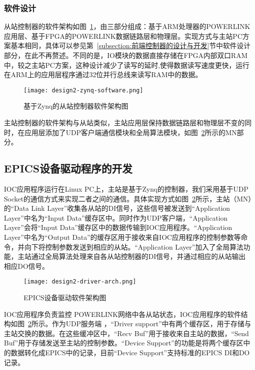 \subsubsection{软件设计}

从站控制器的软件架构如图~\ref{fig:design2-zynq-software}，由三部分组成：基于ARM处理器的POWERLINK应用层、基于FPGA的POWERLINK数据链路层和物理层。实现方式与主站PC方案基本相同，具体可以参见第~\ref{subsection:前端控制器的设计与开发}节中软件设计部分，在此不再赘述。不同的是，IO模块的数据直接存储在FPGA内部双口RAM中，较之主站PC方案，这种设计减少了读写的延时,使得数据读写速度更快，运行在ARM上的应用层程序通过32位并行总线来读写RAM中的数据。

\begin{figure}[htbp]
  \centering
  \texttt{[image: design2-zynq-software.png]}
  \caption{基于Zynq的从站控制器软件架构图}
  \label{fig:design2-zynq-software}
\end{figure}

主站控制器的软件架构与从站类似，主站应用层保持数据链路层和物理层不变的同时，在应用层添加了UDP客户端通信模块和全局算法模块，如图~\ref{fig:design2-driver-arch}所示的MN部分。

\subsection{EPICS设备驱动程序的开发}

IOC应用程序运行在Linux PC上，主站是基于Zynq的控制器，我们采用基于UDP Socket的通信方式来实现二者之间的通信。具体实现方式如图~\ref{fig:design2-driver-arch}所示，主站（MN）的“Data Link Layer”收集各从站的DI信号，这些信号被发送到“Application Layer”中名为“Input Data”缓存区中。同时作为UDP客户端，“Application Layer”会将“Input Data”缓存区中的数据传输到IOC应用程序。“Application Layer”中名为“Output Data”的缓存区用于接收来自IOC应用程序的控制参数等命令，并向下将控制参数发送到相应的从站。“Application Layer”加入了全局算法功能，主站通过全局算法处理来自各从站控制器的DI信号，并通过相应的从站输出相应DO信号。

\begin{figure}[htbp]
  \centering
  \texttt{[image: design2-driver-arch.png]}
  \caption{EPICS设备驱动软件架构图}
  \label{fig:design2-driver-arch}
\end{figure}

IOC应用程序负责监控 POWERLINK网络中各从站状态，IOC应用程序的软件结构如图~\ref{fig:design2-driver-arch}所示。作为UDP服务端 ，“Driver support”中有两个缓存区，用于存储与主站交换的数据。在这些缓冲区中，“Recv Buf”用于接收来自主站的数据，“Send Buf”用于存储发送至主站的控制参数。“Device Support”的功能是将两个缓存区中的数据转化成EPICS中的记录，目前“Device Support”支持标准的EPICS DI和DO记录。

